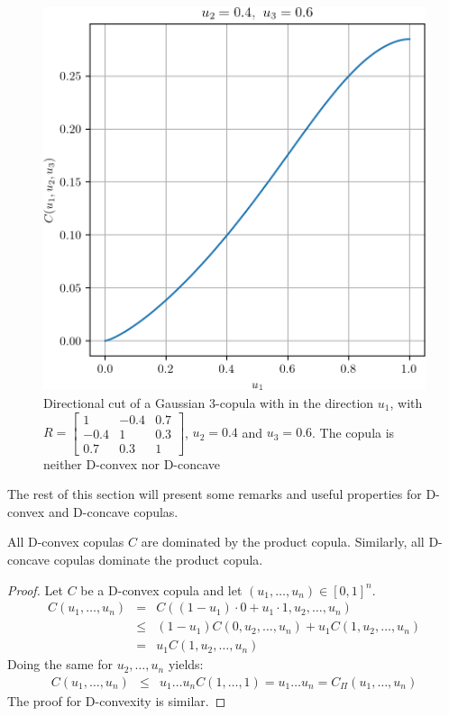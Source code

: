 \begin{figure}
    \centering
    \includegraphics[width=0.5\linewidth]{Images/Guassian_copula/gaussian_copula_n3.png}
    \caption{Directional cut of a Gaussian 3-copula with in the direction $u_1$, with $R=\begin{bmatrix} 1 & -0.4 & 0.7\\ -0.4 & 1 & 0.3\\ 0.7 & 0.3 & 1 \end{bmatrix}$, $u_2=0.4$ and $u_3=0.6$. The copula is neither D-convex nor D-concave}
    \label{fig:gaussian_copula_simu_n3}
\end{figure}

The rest of this section will present some remarks and useful properties for D-convex and D-concave copulas.

\begin{remark}
    All D-convex copulas $C$ are dominated by the product copula. 
    Similarly, all D-concave copulas dominate the product copula.
\end{remark}
\begin{proof}
    Let $C$ be a D-convex copula and let $(u_1, \dots, u_n)\in[0,1]^n$.
    \begin{eqnarray*}
        C(u_1,\dots, u_n) &=& C((1-u_1)\cdot0+u_1\cdot 1, u_2, \dots, u_n)\\
        &\leqslant& (1-u_1)C(0, u_2,\dots, u_n)+u_1C(1, u_2, \dots, u_n)\\
        &=& u_1C(1, u_2,\dots, u_n)
    \end{eqnarray*}
    Doing the same for $u_2,\dots,u_n$ yields:
    \begin{eqnarray*}
        C(u_1,\dots, u_n) &\leqslant& u_1\dots u_nC(1,\dots,1) = u_1\dots u_n = C_\Pi(u_1,\dots,u_n)
    \end{eqnarray*}
    The proof for D-convexity is similar.
\end{proof}

